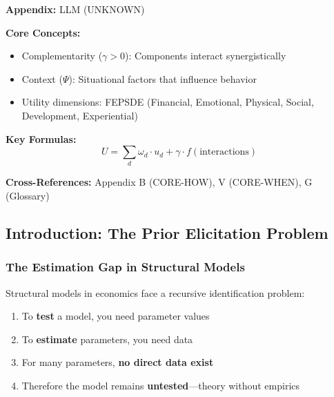 \begin{tcolorbox}[colback=blue!5!white, colframe=blue!75!black,
    title=Quick Reference: Unknown]

\textbf{Appendix:} LLM (UNKNOWN)

\textbf{Core Concepts:}
\begin{itemize}[nosep]
\item Complementarity ($\gamma > 0$): Components interact synergistically
\item Context ($\Psi$): Situational factors that influence behavior
\item Utility dimensions: FEPSDE (Financial, Emotional, Physical, Social, Development, Experiential)
\end{itemize}

\textbf{Key Formulas:}
\begin{equation}
U = \sum_d \omega_d \cdot u_d + \gamma \cdot f(\text{interactions})
\end{equation}

\textbf{Cross-References:} Appendix B (CORE-HOW), V (CORE-WHEN), G (Glossary)
\end{tcolorbox}

\subsection{Introduction: The Prior Elicitation Problem}

\subsubsection{The Estimation Gap in Structural Models}

Structural models in economics face a recursive identification problem:

\begin{enumerate}
    \item To \textbf{test} a model, you need parameter values
    \item To \textbf{estimate} parameters, you need data
    \item For many parameters, \textbf{no direct data exist}
    \item Therefore the model remains \textbf{untested}---theory without empirics
\end{enumerate}

